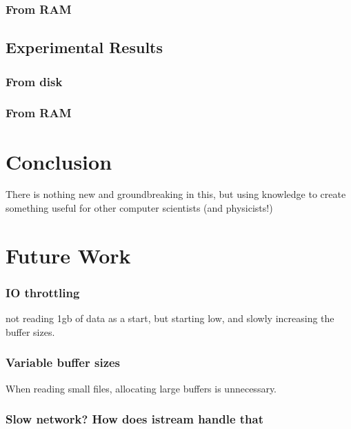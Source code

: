 \documentclass[a4paper]{article}
\begin{document}
\subsubsection{From RAM}



\subsection{Experimental Results}

\subsubsection{From disk}

\subsubsection{From RAM}





\newpage
\section{Conclusion}
There is nothing new and groundbreaking in this, but using knowledge to create something useful for other computer scientists (and physicists!)



\section{Future Work}
\subsubsection{IO throttling}
not reading 1gb of data as a start, but starting low, and slowly increasing the buffer sizes.

\subsubsection{Variable buffer sizes}
When reading small files, allocating large buffers is unnecessary.

\subsubsection{Slow network? How does istream handle that}




\end{document}
